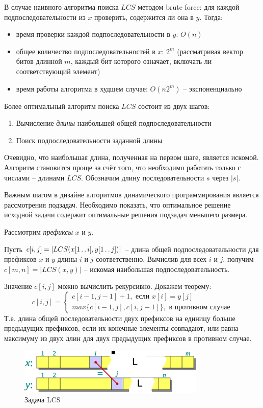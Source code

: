 \documentclass[11pt]{article}
\begin{document}
В случае наивного алгоритма поиска $LCS$ методом brute force: для каждой подпоследовательности из $x$ проверить, содержится ли она в $y$. Тогда:
\begin{itemize}
\item время проверки каждой подпоследовательности в $y$: $O(n)$
\item общее количество подпоследовательностей в $x$: $2^m$ (рассматривая вектор битов длинной $m$, каждый бит которого означает, включать ли соответствующий элемент)
\item время работы алгоритма в худшем случае: $O(n2^m)$ -- экспоненциально
\end{itemize}

Более оптимальный алгоритм поиска $LCS$ состоит из двух шагов:
\begin{enumerate}
\item Вычисление \emph{длины} наибольшей общей подпоследовательности
\item Поиск подпоследовательности заданной длины
\end{enumerate}
Очевидно, что наибольшая длина, полученная на первом шаге, является искомой. Алгоритм становится проще за счёт того, что необходимо работать только с числами -- длинами $LCS$. Обозначим длину последовательности $s$ через $|s|$.

Важным шагом в дизайне алгоритмов динамического программирования является рассмотрения подзадач. Необходимо показать, что оптимальное решение исходной задачи содержит оптимальные решения подзадач меньшего размера.

Рассмотрим \emph{префиксы} $x$ и $y$. 

Пусть $c[i, j] = |LCS(x[1 \mathinner{\ldotp\ldotp} i], y[1 \mathinner{\ldotp\ldotp} j])|$ -- длина общей подпоследовательности для префиксов $x$ и $y$ длины $i$ и $j$ соответственно. Вычислив для всех $i$ и $j$, получим $c[m, n] = |LCS(x, y)|$ -- искомая наибольшая подпоследовательность.

Значение $c[i, j]$ можно вычислить рекурсивно. Докажем теорему:
\begin{equation*}
  c[i, j] = \begin{cases}
    c[i-1, j-1] + 1, \text{ если } x[i] = y[j] \\
    max\{c[i-1, j], c[i, j-1]\}, \text{ в противном случае}
    \end{cases}
\end{equation*}
Т.е. длина общей последовательности двух префиксов на единицу больше предыдущих префиксов, если их конечные элементы совпадают, или равна максимуму из двух длин для двух предыдущих префиксов в противном случае.
\begin{figure}[ht]
  \centering
  \includegraphics[width=3.5in]{lecture15/lcs.eps}
  \caption{Задача LCS}
\end{figure}
\end{document}
